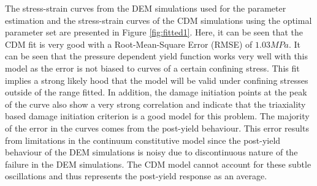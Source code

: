 The stress-strain curves from the DEM simulations used for the parameter estimation and the stress-strain curves of the CDM simulations using the optimal parameter set are presented in Figure \ref{fig:fitted1}. Here, it can be seen that the CDM fit is very good with a Root-Mean-Square Error (RMSE) of $1.03MPa$. It can be seen that the pressure dependent yield function works very well with this model as the error is not biased to curves of a certain confining stress. This fit implies a strong likely hood that the model will be valid under confining stresses outside of the range fitted. In addition, the damage initiation points at the peak of the curve also show a very strong correlation and indicate that the triaxiality based damage initiation criterion is a good model for this problem. The majority of the error in the curves comes from the post-yield behaviour. This error results from limitations in the continuum constitutive model since the post-yield behaviour of the DEM simulations is noisy due to discontinuous nature of the failure in the DEM simulations. The CDM model cannot account for these subtle oscillations and thus represents the post-yield response as an average. 
